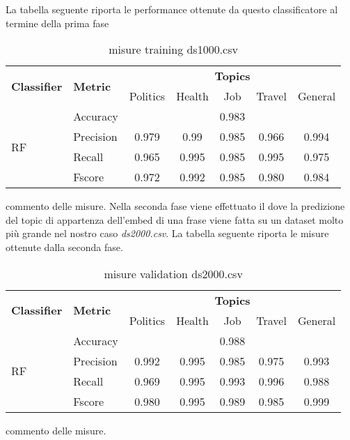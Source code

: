 La tabella seguente riporta le performance ottenute da questo classificatore al termine della prima fase
\begin{table}[h]
\begin{tabular}{|l|l|c|c|c|c|c|}
\hline
\multirow{2}{*}{\textbf{Classifier}} & \multirow{2}{*}{\textbf{Metric}} & \multicolumn{5}{c|}{\textbf{Topics}} \\ \cline{3-7} 
 &  & Politics & Health & Job & Travel & General \\ \hline
\multirow{4}{*}{RF} & Accuracy & \multicolumn{5}{c|}{0.983} \\ \cline{2-7} 
 & Precision & 0.979 & 0.99 & 0.985 & 0.966 & 0.994 \\ \cline{2-7} 
 & Recall & 0.965 & 0.995 & 0.985  & 0.995 & 0.975 \\ \cline{2-7} 
 & Fscore & 0.972 & 0.992 & 0.985 & 0.980 & 0.984 \\ \hline
\end{tabular}
\caption{misure training ds1000.csv}
\end{table}
\FloatBarrier
commento delle misure.\newline
Nella seconda fase viene effettuato il  dove la predizione del topic di appartenza dell'embed di una frase viene fatta su un dataset molto più grande nel nostro caso \textit{ds2000.csv}.\newline
La tabella seguente riporta le misure ottenute dalla seconda fase. 
\begin{table}[h]
\begin{tabular}{|l|l|c|c|c|c|c|}
\hline
\multirow{2}{*}{\textbf{Classifier}} & \multirow{2}{*}{\textbf{Metric}} & \multicolumn{5}{c|}{\textbf{Topics}} \\ \cline{3-7} 
 &  & Politics & Health & Job & Travel & General \\ \hline
\multirow{4}{*}{RF} & Accuracy & \multicolumn{5}{c|}{0.988} \\ \cline{2-7} 
 & Precision & 0.992 & 0.995 & 0.985 & 0.975 & 0.993 \\ \cline{2-7} 
 & Recall & 0.969 & 0.995 & 0.993 & 0.996 & 0.988 \\ \cline{2-7} 
 & Fscore & 0.980 & 0.995 & 0.989 & 0.985 & 0.999 \\ \hline
\end{tabular}
\caption{misure validation ds2000.csv}
\end{table}
\FloatBarrier
commento delle misure.\newline

